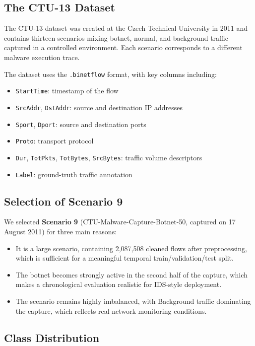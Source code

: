 \documentclass{article}
\begin{document}
\subsection{The CTU-13 Dataset}

The CTU-13 dataset \cite{ctu13} was created at the Czech Technical University in 2011 and contains thirteen scenarios mixing botnet, normal, and background traffic captured in a controlled environment. Each scenario corresponds to a different malware execution trace.

The dataset uses the \texttt{.binetflow} format, with key columns including:
\begin{itemize}
  \item \texttt{StartTime}: timestamp of the flow
  \item \texttt{SrcAddr}, \texttt{DstAddr}: source and destination IP addresses
  \item \texttt{Sport}, \texttt{Dport}: source and destination ports
  \item \texttt{Proto}: transport protocol
  \item \texttt{Dur}, \texttt{TotPkts}, \texttt{TotBytes}, \texttt{SrcBytes}: traffic volume descriptors
  \item \texttt{Label}: ground-truth traffic annotation
\end{itemize}

\subsection{Selection of Scenario 9}

We selected \textbf{Scenario 9} (CTU-Malware-Capture-Botnet-50, captured on 17 August 2011) for three main reasons:
\begin{itemize}
  \item It is a large scenario, containing 2{,}087{,}508 cleaned flows after preprocessing, which is sufficient for a meaningful temporal train/validation/test split.
  \item The botnet becomes strongly active in the second half of the capture, which makes a chronological evaluation realistic for IDS-style deployment.
  \item The scenario remains highly imbalanced, with Background traffic dominating the capture, which reflects real network monitoring conditions.
\end{itemize}

\subsection{Class Distribution}
\end{document}
